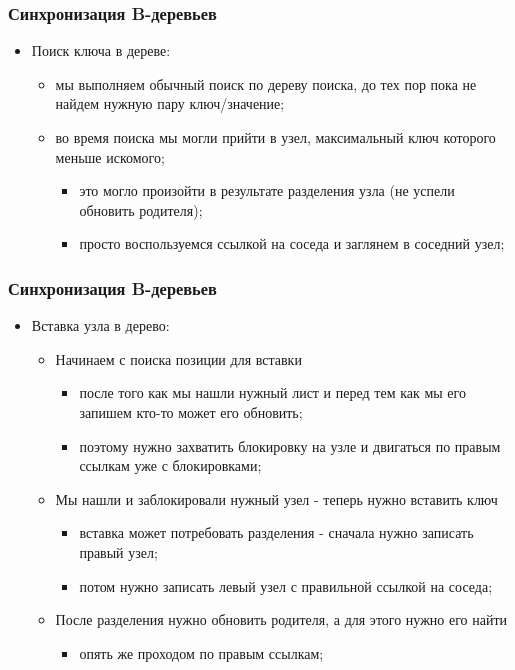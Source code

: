 \begin{frame}
\frametitle{Синхронизация B-деревьев}
\begin{itemize}
  \item Поиск ключа в дереве:
    \begin{itemize}
      \item мы выполняем обычный поиск по дереву поиска, до тех пор пока не найдем нужную пару ключ/значение;
      \item во время поиска мы могли прийти в узел, максимальный ключ которого меньше искомого;
        \begin{itemize}
          \item это могло произойти в результате разделения узла (не успели обновить родителя);
          \item просто воспользуемся ссылкой на соседа и заглянем в соседний узел;
        \end{itemize}
    \end{itemize}
\end{itemize}
\end{frame}

\begin{frame}
\frametitle{Синхронизация B-деревьев}
\begin{itemize}
  \item Вставка узла в дерево:
    \begin{itemize}
      \item Начинаем с поиска позиции для вставки
        \begin{itemize}
          \item после того как мы нашли нужный лист и перед тем как мы его запишем кто-то может его обновить;
          \item поэтому нужно захватить блокировку на узле и двигаться по правым ссылкам уже с блокировками;
        \end{itemize}
      \item Мы нашли и заблокировали нужный узел - теперь нужно вставить ключ
        \begin{itemize}
          \item вставка может потребовать разделения - сначала нужно записать правый узел;
          \item потом нужно записать левый узел с правильной ссылкой на соседа;
        \end{itemize}
      \item После разделения нужно обновить родителя, а для этого нужно его найти
        \begin{itemize}
          \item опять же проходом по правым ссылкам;
        \end{itemize}
    \end{itemize}
\end{itemize}
\end{frame}

